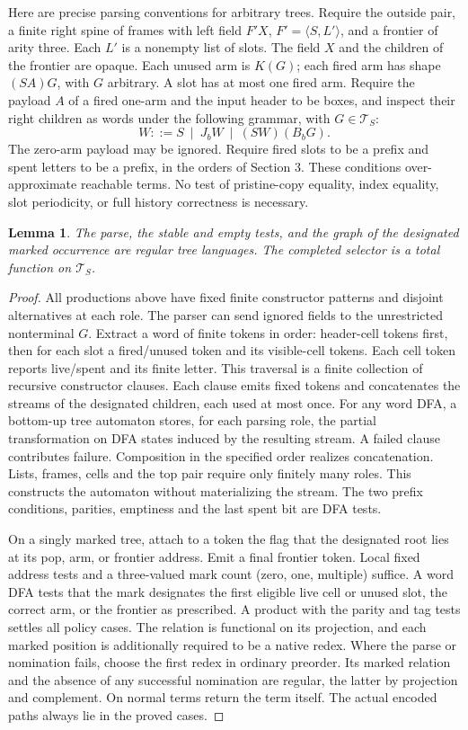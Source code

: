 \documentclass[11pt,letterpaper,oneside,reqno]{amsart}
\newtheorem{lemma}[theorem]{Lemma}
\newcommand{\T}{\mathcal T_S}
\newcommand{\pair}[2]{\langle #1,#2\rangle}
\begin{document}
Here are precise parsing conventions for arbitrary trees. Require the outside pair, a finite right spine of frames with left field \(F'X\), \(F'=\pair{S}{L'}\), and a frontier of arity three. Each \(L'\) is a nonempty list of slots. The field \(X\) and the children of the frontier are opaque. Each unused arm is \(K(G)\); each fired arm has shape \((SA)G\), with \(G\) arbitrary. A slot has at most one fired arm. Require the payload \(A\) of a fired one-arm and the input header to be boxes, and inspect their right children as words under the following grammar, with \(G\in\T\):
\[
 W ::= S\ \mid\ J_b W\ \mid\ (SW)(B_bG).
\]
The zero-arm payload may be ignored. Require fired slots to be a prefix and spent letters to be a prefix, in the orders of Section 3. These conditions over-approximate reachable terms. No test of pristine-copy equality, index equality, slot periodicity, or full history correctness is necessary.

\begin{lemma}\label{regularlem}
The parse, the stable and empty tests, and the graph of the designated marked occurrence are regular tree languages. The completed selector is a total function on \(\T\).
\end{lemma}
\begin{proof}
All productions above have fixed finite constructor patterns and disjoint alternatives at each role. The parser can send ignored fields to the unrestricted nonterminal \(G\). Extract a word of finite tokens in order: header-cell tokens first, then for each slot a fired/unused token and its visible-cell tokens. Each cell token reports live/spent and its finite letter. This traversal is a finite collection of recursive constructor clauses. Each clause emits fixed tokens and concatenates the streams of the designated children, each used at most once. For any word DFA, a bottom-up tree automaton stores, for each parsing role, the partial transformation on DFA states induced by the resulting stream. A failed clause contributes failure. Composition in the specified order realizes concatenation. Lists, frames, cells and the top pair require only finitely many roles. This constructs the automaton without materializing the stream. The two prefix conditions, parities, emptiness and the last spent bit are DFA tests.

On a singly marked tree, attach to a token the flag that the designated root lies at its pop, arm, or frontier address. Emit a final frontier token. Local fixed address tests and a three-valued mark count (zero, one, multiple) suffice. A word DFA tests that the mark designates the first eligible live cell or unused slot, the correct arm, or the frontier as prescribed. A product with the parity and tag tests settles all policy cases. The relation is functional on its projection, and each marked position is additionally required to be a native redex. Where the parse or nomination fails, choose the first redex in ordinary preorder. Its marked relation and the absence of any successful nomination are regular, the latter by projection and complement. On normal terms return the term itself. The actual encoded paths always lie in the proved cases.
\end{proof}
\end{document}

